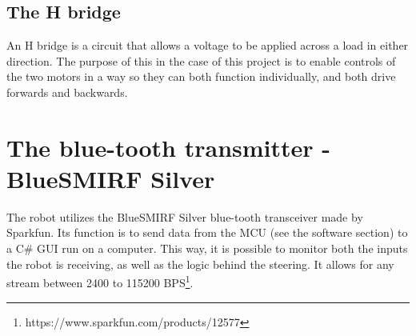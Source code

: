 \subsection{The H bridge}
An H bridge is a circuit that allows a voltage to be applied across a load in either direction. The purpose of this in the case of this project is to enable controls of the two motors in a way so they can both function individually, and both drive forwards and backwards.\\

\section{The blue-tooth transmitter - BlueSMIRF Silver}
The robot utilizes the BlueSMIRF Silver blue-tooth transceiver made by Sparkfun. Its function is to send data from the MCU (see the software section) to a C\# GUI run on a computer. This way, it is possible to monitor both the inputs the robot is receiving, as well as the logic behind the steering. It allows for any stream between 2400 to 115200 BPS\footnote{https://www.sparkfun.com/products/12577}. 
